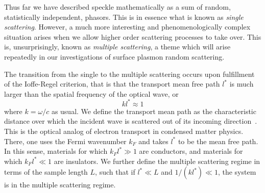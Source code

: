 Thus far we have described speckle mathematically as a sum of random,
statistically independent, phasors.  This is in essence what is known as
\textit{single scattering}.  However, a much more interesting and
phenomenologically complex situation arises when we allow higher order
scattering processes to take over.  This is, unsurprisingly, known as
\textit{multiple scattering}, a theme which will arise repeatedly in
our investigations of surface plasmon random scattering.  

The transition from the single to the multiple scattering occurs upon
fulfillment of the Ioffe-Regel criterion, that is that the transport mean free path
$l^*$ is much larger than the spatial frequency of the optical wave, or
\begin{equation}
k l^* \approx 1
\end{equation}
where $k=\omega/c$ as usual.  We define the transport mean path as the
characteristic distance over which the incident wave is scattered out of
its incoming direction~\cite{berkovits1994correlations}.  This is the
optical analog of electron transport in condensed matter physics.  There,
one uses the Fermi wavenumber $k_F$ and takes $l^*$ to be the mean free
path.  In this sense, materials for which $k_F l^* \gg 1$ are conductors, and materials
for which $k_F l^* \ll 1$ are insulators.  
We further define the multiple scattering regime in terms of the sample
length $L$, such that if $l^* \ll L$ and $1/(k l^*) \ll 1$, the system is in
the multiple scattering regime.  


